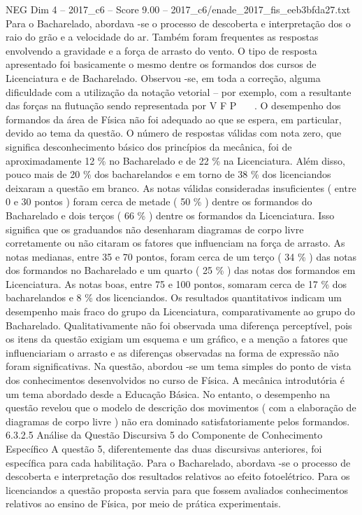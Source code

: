 \begin{textsample}{NEG Dim 4 – 2017\_c6 – Score 9.00 – 2017\_c6/enade\_2017\_fis\_eeb3bfda27.txt}
Para o Bacharelado, abordava -se o processo de descoberta e interpretação dos o raio do grão e a velocidade do ar.
Também foram frequentes as respostas envolvendo a gravidade e a força de arrasto do vento.
O tipo de resposta apresentado foi basicamente o mesmo dentre os formandos dos cursos de Licenciatura e de Bacharelado.
Observou -se, em toda a correção, alguma dificuldade com a utilização da notação vetorial – por exemplo, com a resultante das forças na flutuação sendo representada por V F P   .
O desempenho dos formandos da área de Física não foi adequado ao que se espera, em particular, devido ao tema da questão.
O número de respostas válidas com nota zero, que significa desconhecimento básico dos princípios da mecânica, foi de aproximadamente 12 \% no Bacharelado e de 22 \% na Licenciatura.
Além disso, pouco mais de 20 \% dos bacharelandos e em torno de 38 \% dos licenciandos deixaram a questão em branco.
As notas válidas consideradas insuficientes ( entre 0 e 30 pontos ) foram cerca de metade ( 50 \% ) dentre os formandos do Bacharelado e dois terços ( 66 \% ) dentre os formandos da Licenciatura.
Isso significa que os graduandos não desenharam diagramas de corpo livre corretamente ou não citaram os fatores que influenciam na força de arrasto.
As notas medianas, entre 35 e 70 pontos, foram cerca de um terço ( 34 \% ) das notas dos formandos no Bacharelado e um quarto ( 25 \% ) das notas dos formandos em Licenciatura.
As notas boas, entre 75 e 100 pontos, somaram cerca de 17 \% dos bacharelandos e 8 \% dos licenciandos.
Os resultados quantitativos indicam um desempenho mais fraco do grupo da Licenciatura, comparativamente ao grupo do Bacharelado.
Qualitativamente não foi observada uma diferença perceptível, pois os itens da questão exigiam um esquema e um gráfico, e a menção a fatores que influenciariam o arrasto e as diferenças observadas na forma de expressão não foram significativas.
Na questão, abordou -se um tema simples do ponto de vista dos conhecimentos desenvolvidos no curso de Física.
A mecânica introdutória é um tema abordado desde a Educação Básica.
No entanto, o desempenho na questão revelou que o modelo de descrição dos movimentos ( com a elaboração de diagramas de corpo livre ) não era dominado satisfatoriamente pelos formandos. 6.3.2.5 Análise da Questão Discursiva 5 do Componente de Conhecimento Específico A questão 5, diferentemente das duas discursivas anteriores, foi específica para cada habilitação.
Para o Bacharelado, abordava -se o processo de descoberta e interpretação dos resultados relativos ao efeito fotoelétrico.
Para os licenciandos a questão proposta servia para que fossem avaliados conhecimentos relativos ao ensino de Física, por meio de prática experimentais.

\end{textsample}
